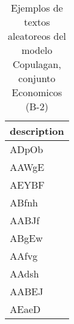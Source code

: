 \begin{table}[H]
\centering
\fontsize{8}{14}\selectfont
\caption{Ejemplos de textos aleatoreos del modelo Copulagan, conjunto Economicos (B-2)}
\label{table-sample10-economicos-b-2-copulagan-text}
\begin{tabular}{|m{50em}|}
\hline
\rowcolor[gray]{0.8}
description \\
\hline ADpOb \\
\hline AAWgE \\
\hline AEYBF \\
\hline ABfnh \\
\hline AABJf \\
\hline ABgEw \\
\hline AAfvg \\
\hline AAdsh \\
\hline AABEJ \\
\hline AEaeD \\
\hline
\end{tabular}
\end{table}
